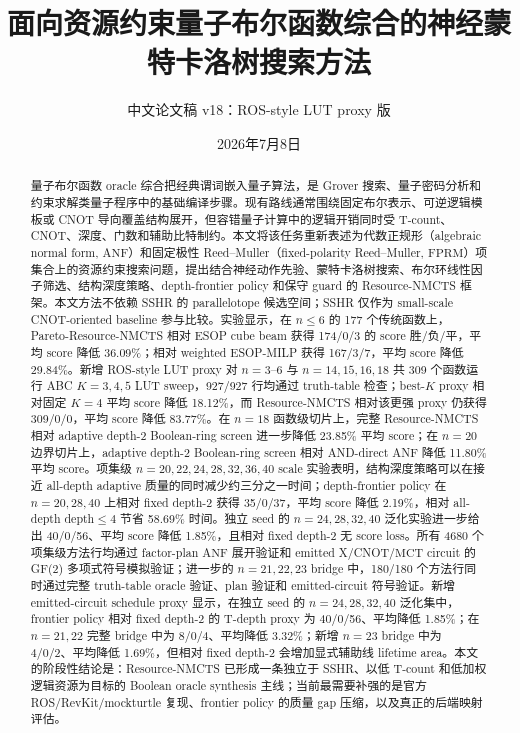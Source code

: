 \documentclass[UTF8,fontset=macnew,11pt]{ctexart}
\title{面向资源约束量子布尔函数综合的神经蒙特卡洛树搜索方法}
\author{中文论文稿 v18：ROS-style LUT proxy 版}
\date{2026年7月8日}
\newcommand{\method}{Resource-NMCTS}
\newcommand{\screen}{Boolean-ring screen}
\newcommand{\anf}{\ensuremath{\mathrm{ANF}}}
\newcommand{\fprm}{\ensuremath{\mathrm{FPRM}}}
\newcommand{\ttable}{truth-table}
\newcommand{\mct}{\ensuremath{\mathrm{MCT}}}
\begin{document}
\pagestyle{plain}
\maketitle

\begin{abstract}
量子布尔函数 oracle 综合把经典谓词嵌入量子算法，是 Grover 搜索、量子密码分析和约束求解类量子程序中的基础编译步骤。现有路线通常围绕固定布尔表示、可逆逻辑模板或 CNOT 导向覆盖结构展开，但容错量子计算中的逻辑开销同时受 T-count、CNOT、深度、门数和辅助比特制约。本文将该任务重新表述为代数正规形（algebraic normal form, \anf{}）和固定极性 Reed--Muller（fixed-polarity Reed--Muller, \fprm{}）项集合上的资源约束搜索问题，提出结合神经动作先验、蒙特卡洛树搜索、布尔环线性因子筛选、结构深度策略、depth-frontier policy 和保守 guard 的 \method{} 框架。本文方法不依赖 SSHR 的 parallelotope 候选空间；SSHR 仅作为 small-scale CNOT-oriented baseline 参与比较。实验显示，在 $n\leq6$ 的 177 个传统函数上，Pareto-\method{} 相对 ESOP cube beam 获得 174/0/3 的 score 胜/负/平，平均 score 降低 36.09\%；相对 weighted ESOP-MILP 获得 167/3/7，平均 score 降低 29.84\%。新增 ROS-style LUT proxy 对 $n=3$--$6$ 与 $n=14,15,16,18$ 共 309 个函数运行 ABC $K=3,4,5$ LUT sweep，927/927 行均通过 truth-table 检查；best-$K$ proxy 相对固定 $K=4$ 平均 score 降低 18.12\%，而 \method{} 相对该更强 proxy 仍获得 309/0/0，平均 score 降低 83.77\%。在 $n=18$ 函数级切片上，完整 \method{} 相对 adaptive depth-2 \screen{} 进一步降低 23.85\% 平均 score；在 $n=20$ 边界切片上，adaptive depth-2 \screen{} 相对 AND-direct ANF 降低 11.80\% 平均 score。项集级 $n=20,22,24,28,32,36,40$ scale 实验表明，结构深度策略可以在接近 all-depth adaptive 质量的同时减少约三分之一时间；depth-frontier policy 在 $n=20,28,40$ 上相对 fixed depth-2 获得 35/0/37，平均 score 降低 2.19\%，相对 all-depth depth$\leq4$ 节省 58.69\% 时间。独立 seed 的 $n=24,28,32,40$ 泛化实验进一步给出 40/0/56、平均 score 降低 1.85\%，且相对 fixed depth-2 无 score loss。所有 4680 个项集级方法行均通过 factor-plan \anf{} 展开验证和 emitted X/CNOT/\mct{} circuit 的 GF(2) 多项式符号模拟验证；进一步的 $n=21,22,23$ bridge 中，180/180 个方法行同时通过完整 \ttable{} oracle 验证、plan 验证和 emitted-circuit 符号验证。新增 emitted-circuit schedule proxy 显示，在独立 seed 的 $n=24,28,32,40$ 泛化集中，frontier policy 相对 fixed depth-2 的 T-depth proxy 为 40/0/56、平均降低 1.85\%；在 $n=21,22$ 完整 bridge 中为 8/0/4、平均降低 3.32\%；新增 $n=23$ bridge 中为 4/0/2、平均降低 1.69\%，但相对 fixed depth-2 会增加显式辅助线 lifetime area。本文的阶段性结论是：\method{} 已形成一条独立于 SSHR、以低 T-count 和低加权逻辑资源为目标的 Boolean oracle synthesis 主线；当前最需要补强的是官方 ROS/RevKit/mockturtle 复现、frontier policy 的质量 gap 压缩，以及真正的后端映射评估。
\end{abstract}
\end{document}
